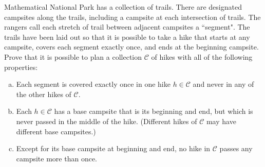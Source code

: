 Mathematical National Park has a collection of trails. There are designated
campsites along the trails, including a campsite at each intersection of
trails. The rangers call each stretch of trail between adjacent campsites a
``segment". The trails have been laid out so that it is possible to take a hike
that starts at any campsite, covers each segment exactly once, and ends at the
beginning campsite. Prove that it is possible to plan a collection
$\mathcal{C}$ of hikes with all of the following properties:

\begin{enumerate}[(a)]

\item Each segment is covered exactly once in one hike $h \in \mathcal{C}$ and
      never in any of the other hikes of $\mathcal{C}$.
\item Each $h \in \mathcal{C}$ has a base campsite that is its beginning and
      end, but which is never passed in the middle of the hike. (Different hikes of
      $\mathcal{C}$ may have different base campsites.)
\item Except for its base campsite at beginning and end, no hike in
      $\mathcal{C}$ passes any campsite more than once.

\end{enumerate}

